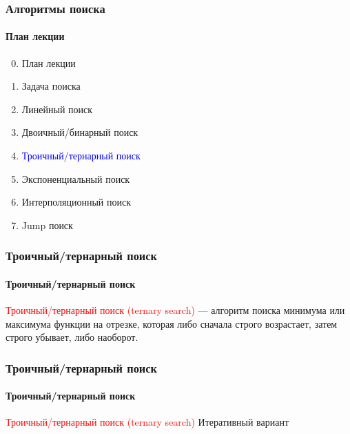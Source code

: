 \documentclass[aspectratio=169]{beamer}
\begin{document}
\begin{frame}
\frametitle{Алгоритмы поиска}
\framesubtitle{План лекции}

\begin{enumerate}
  \setcounter{enumi}{-1}
  \item{План лекции}
  \item{Задача поиска}
  \item{Линейный поиск}
  \item{Двоичный/бинарный поиск}
  \item{\textcolor{blue}{Троичный/тернарный поиск}}
  \item{Экспоненциальный поиск}
  \item{Интерполяционный поиск}
  \item{Jump поиск}
\end{enumerate}
\end{frame}

\begin{frame}
\frametitle{Троичный/тернарный поиск}
\framesubtitle{Троичный/тернарный поиск}
\justifying
\textcolor{red}{Троичный/тернарный поиск (ternary search)} — алгоритм поиска минимума или \newline максимума функции на отрезке, которая либо сначала строго возрастает, затем строго убывает, либо наоборот. 

\begin{figure}
    \captionsetup[subfigure]{labelformat=empty}
    \centering
\end{figure}
\end{frame}

\begin{frame}
\frametitle{Троичный/тернарный поиск}
\framesubtitle{Троичный/тернарный поиск}
\justifying
\textcolor{red}{Троичный/тернарный поиск (ternary search)}\newline\newline
Итеративный вариант

\begin{figure}
    \captionsetup[subfigure]{labelformat=empty}
    \centering
\end{figure}
\end{frame}
\end{document}
